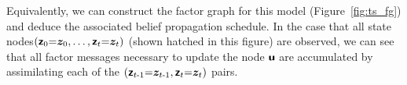 Equivalently, we can construct the factor graph \citep{KschischangFactor2001,FreyFactor1997} for this model (Figure~\ref{fig:ts_fg}) and deduce the associated belief propagation schedule.
In the case that all state nodes\(\left(\boldsymbol{\mathsf{z}}_{0}{=}\boldsymbol{z}_{0},\dots, \boldsymbol{\mathsf{z}}_{t}{=}\boldsymbol{z}_{t}\right)\) (shown hatched in this figure) are observed, we can see that all factor messages necessary to update the node \(\boldsymbol{\mathsf{u}}\) are accumulated by assimilating each of the \(\left(\boldsymbol{\mathsf{z}}_{t{\operatorname{-}}1}{=}\boldsymbol{z}_{t{\operatorname{-}}1}, \boldsymbol{\mathsf{z}}_{t}{=}\boldsymbol{z}_{t}\right)\) pairs.

